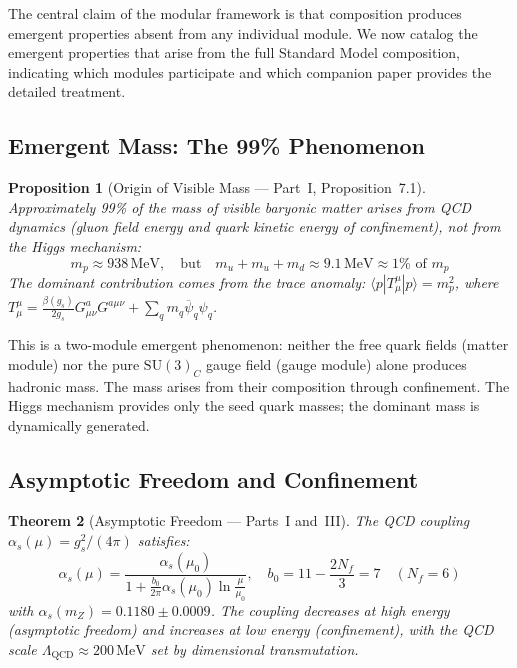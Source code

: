 \documentclass[12pt]{article}
\newtheorem{theorem}{Theorem}[section]
\newtheorem{proposition}[theorem]{Proposition}
\theoremstyle{definition}
\theoremstyle{remark}
\newcommand{\psibar}{\overline{\psi}}
\newcommand{\MeV}{\,\mathrm{MeV}}
\newcommand{\su}[1]{\mathrm{SU}(#1)}
\newcommand{\vev}[1]{\langle #1 \rangle}
\begin{document}
The central claim of the modular framework is that composition produces emergent properties absent from any individual module. We now catalog the emergent properties that arise from the full Standard Model composition, indicating which modules participate and which companion paper provides the detailed treatment.

\subsection{Emergent Mass: The 99\% Phenomenon}

\begin{proposition}[Origin of Visible Mass --- Part~I, Proposition~7.1]
\label{prop:emergent-mass}
Approximately 99\% of the mass of visible baryonic matter arises from QCD dynamics (gluon field energy and quark kinetic energy of confinement), not from the Higgs mechanism:
\begin{equation}
m_p \approx 938\MeV, \quad \text{but} \quad m_u + m_u + m_d \approx 9.1\MeV \approx 1\% \text{ of } m_p
\end{equation}
The dominant contribution comes from the trace anomaly: $\vev{p|T^\mu_\mu|p} = m_p^2$, where $T^\mu_\mu = \frac{\beta(g_s)}{2g_s}G^a_{\mu\nu}G^{a\mu\nu} + \sum_q m_q\psibar_q\psi_q$.
\end{proposition}

This is a two-module emergent phenomenon: neither the free quark fields (matter module) nor the pure $\su{3}_C$ gauge field (gauge module) alone produces hadronic mass. The mass arises from their composition through confinement. The Higgs mechanism provides only the seed quark masses; the dominant mass is dynamically generated.

\subsection{Asymptotic Freedom and Confinement}

\begin{theorem}[Asymptotic Freedom --- Parts~I and~III]
\label{thm:asymptotic-freedom}
The QCD coupling $\alpha_s(\mu) = g_s^2/(4\pi)$ satisfies:
\begin{equation}
\alpha_s(\mu) = \frac{\alpha_s(\mu_0)}{1 + \frac{b_0}{2\pi}\alpha_s(\mu_0)\ln\frac{\mu}{\mu_0}}, \quad b_0 = 11 - \frac{2N_f}{3} = 7 \quad (N_f = 6)
\end{equation}
with $\alpha_s(m_Z) = 0.1180 \pm 0.0009$. The coupling decreases at high energy (asymptotic freedom) and increases at low energy (confinement), with the QCD scale $\Lambda_{\mathrm{QCD}} \approx 200\MeV$ set by dimensional transmutation.
\end{theorem}
\end{document}
